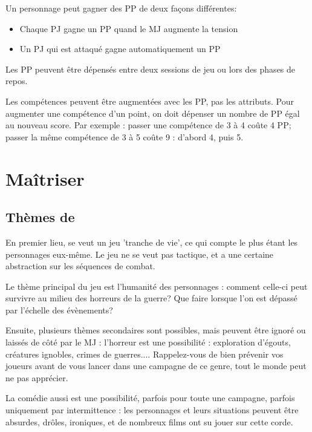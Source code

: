 \documentclass{report}
\begin{document}
\begin{multicols}{2}
Un personnage peut gagner des PP de deux façons différentes:
\begin{itemize}
    \item Chaque PJ gagne un PP quand le MJ augmente la tension
    \item Un PJ qui est attaqué gagne automatiquement un PP
\end{itemize}

Les PP peuvent être dépensés entre deux sessions de jeu ou lors des phases de repos.

Les compétences peuvent être augmentées avec les PP, pas les attributs. Pour augmenter une compétence d'un point, on doit dépenser un nombre de PP égal au nouveau score. Par exemple : passer une compétence de 3 à 4 coûte 4 PP; passer la même compétence de 3 à 5 coûte 9 : d'abord 4, puis 5.
\chapter{Maîtriser \diminutif}
\section{Thèmes de \diminutif}
En premier lieu, \diminutif se veut un jeu 'tranche de vie', ce qui compte le plus étant les personnages eux-même. Le jeu ne se veut pas tactique, et a une certaine abstraction sur les séquences de combat.

Le thème principal du jeu est l'humanité des personnages : comment celle-ci peut survivre au milieu des horreurs de la guerre? Que faire lorsque l'on est dépassé par l'échelle des évènements?

Ensuite, plusieurs thèmes secondaires sont possibles, mais peuvent être ignoré ou laissés de côté par le MJ : l'horreur est une possibilité : exploration d'égouts, créatures ignobles, crimes de guerres.... Rappelez-vous de bien prévenir vos joueurs avant de vous lancer dans une campagne de ce genre, tout le monde peut ne pas apprécier.

La comédie aussi est une possibilité, parfois pour toute une campagne, parfois uniquement par intermittence : les personnages et leurs situations peuvent être absurdes, drôles, ironiques, et de nombreux films ont su jouer sur cette corde. 


\end{multicols}
\end{document}
